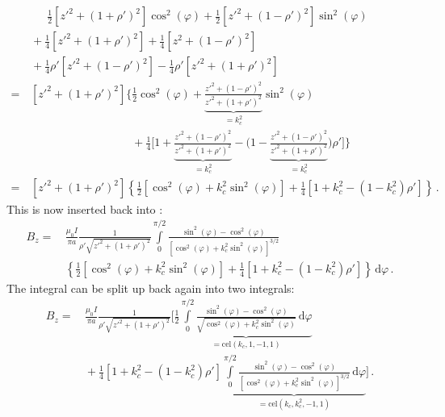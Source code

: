 \begin{align}
 ~&\, \phantom{+}~
        \frac{1}{2} \left[ z'^2 + (1 + \rho')^2 \right] \cos^2(\varphi) + \frac{1}{2} \left[ z'^2 + (1 - \rho')^2 \right] \sin^2(\varphi) \nonumber \\
 ~&\, + \frac{1}{4} \left[ z'^2 + (1 + \rho')^2 \right] + \frac{1}{4} \left[ z^2 + (1 - \rho')^2 \right] \nonumber \\
 ~&\, + \frac{1}{4} \rho' \left[ z'^2 + ( 1 - \rho')^2 \right] - \frac{1}{4} \rho' \left[ z'^2 + (1 + \rho')^2 \right] \nonumber \\
 =&\, \left[ z'^2 + (1 + \rho')^2 \right] \Biggl\{
        \frac{1}{2} \cos^2(\varphi) + \underbrace{\frac{z'^2 + (1 - \rho')^2}{z'^2 + (1 + \rho')^2}}_{=k_c^2} \sin^2(\varphi) \nonumber \\
 ~&\, \phantom{\left[ z'^2 + (1 + \rho')^2 \right] \Biggl\{}
        + \frac{1}{4} \Biggl[ 1 + \underbrace{\frac{z'^2 + (1 - \rho')^2}{z'^2 + (1 + \rho')^2}}_{=k_c^2}
                              - \Biggl( 1 - \underbrace{\frac{z'^2 + (1 - \rho')^2}{z'^2 + (1 + \rho')^2}}_{=k_c^2} \Biggr) \rho' \Biggr] \Biggr\} \nonumber \\
 =&\, \left[ z'^2 + (1 + \rho')^2 \right] \left\{
          \frac{1}{2} \left[ \cos^2(\varphi) + k_c^2 \sin^2(\varphi) \right]
        + \frac{1}{4} \left[ 1 + k_c^2 - \left( 1 - k_c^2 \right) \rho' \right] \right\} \, .
\end{align}
This is now inserted back into :
\begin{align}
  B_z
 =&\, \frac{\mu_0 I}{\pi a}
      \frac{1}{\rho' \sqrt{z'^2 + (1 + \rho')^2}}
      \int\limits_0^{\pi/2}
        \frac{\sin^2(\varphi) - \cos^2(\varphi)}
             {\left[\cos^2(\varphi) + k_c^2 \sin^2(\varphi) \right]^{3/2}} \nonumber \\
 ~&\,   \left\{   \frac{1}{2} \left[ \cos^2(\varphi) + k_c^2 \sin^2(\varphi) \right]
                + \frac{1}{4} \left[ 1 + k_c^2 - \left( 1 - k_c^2 \right) \rho' \right] \right\} \,\mathrm{d}\varphi \, .
\end{align}
The integral can be split up back again into two integrals:
\begin{align}
  B_z
 =&\, \frac{\mu_0 I}{\pi a}
      \frac{1}{\rho' \sqrt{z'^2 + (1 + \rho')^2}} \Biggl[
        \frac{1}{2} \underbrace{\int\limits_0^{\pi/2} \frac{\sin^2(\varphi) - \cos^2(\varphi)}
                                                           {\sqrt{\cos^2(\varphi) + k_c^2 \sin^2(\varphi)}} \,\mathrm{d}\varphi}_{=\textrm{cel}(k_c, 1, -1, 1)} \nonumber \\
 ~&\, + \frac{1}{4} \left[ 1 + k_c^2 - \left( 1 - k_c^2 \right) \rho' \right]
          \underbrace{\int\limits_0^{\pi/2} \frac{\sin^2(\varphi) - \cos^2(\varphi)}
                                                 {\left[\cos^2(\varphi) + k_c^2 \sin^2(\varphi) \right]^{3/2}} \,\mathrm{d}\varphi}_{=\textrm{cel}(k_c, k_c^2, -1, 1)} \Biggr] \, .
\end{align}
